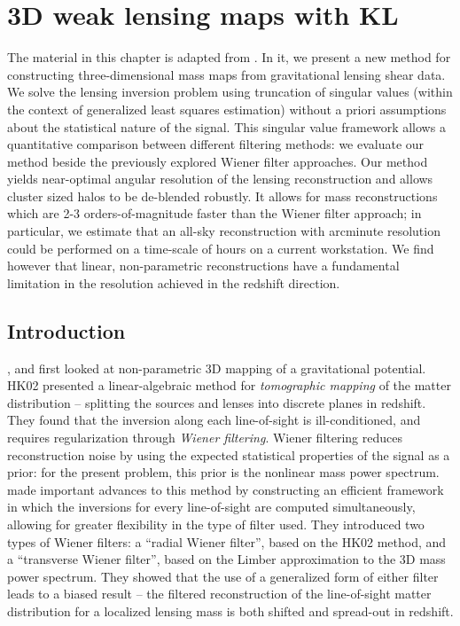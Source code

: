 \chapter{3D weak lensing maps with KL}

The material in this chapter is adapted from \citet{Vanderplas2011}.
In it, we present a new method for constructing three-dimensional
mass maps from gravitational lensing shear data.  We solve the lensing
inversion problem using truncation of singular values
(within the context of generalized
least squares estimation) without a priori assumptions about the
statistical nature of the signal.   This singular value framework 
allows a quantitative
comparison between different filtering methods: we evaluate our method
beside the previously explored Wiener filter approaches.
Our method yields near-optimal angular resolution of the lensing
reconstruction and allows cluster sized halos to be de-blended robustly.
It allows for mass reconstructions which are
2-3 orders-of-magnitude faster than the Wiener
filter approach; in particular, we estimate that an all-sky
reconstruction with arcminute resolution could be performed
on a time-scale of hours on a current workstation.
We find however that linear, 
non-parametric reconstructions have a fundamental limitation in the
resolution achieved in the redshift direction.


\section{Introduction}

\citet{Taylor01}, \citet[][hereafter HK02]{Hu02} and 
\citet{Bacon03} first looked at
non-parametric 3D mapping of a gravitational potential.  HK02
presented a linear-algebraic method for \textit{tomographic mapping}
of the matter distribution -- splitting the sources and lenses into
discrete planes in redshift.  They found that the inversion along each
line-of-sight is ill-conditioned, and requires regularization through 
\textit{Wiener filtering}.  Wiener filtering reduces reconstruction noise
by using the expected statistical properties of the signal as a prior: 
for the present problem, this prior is the nonlinear mass power spectrum.  
\citet[][hereafter STH09]{Simon09}
made important advances to this method by constructing an efficient
framework in which the inversions for every line-of-sight are computed
simultaneously, allowing for greater flexibility in the
type of filter used.  They introduced two types of Wiener filters: 
a ``radial Wiener filter'', based on the HK02 method, 
and a ``transverse Wiener filter'', 
based on the Limber approximation to
the 3D mass power spectrum.
They showed that the use of a generalized form of either
filter leads to a biased result -- the filtered reconstruction of the
line-of-sight matter distribution for a localized lensing mass is both
shifted and spread-out in redshift.

